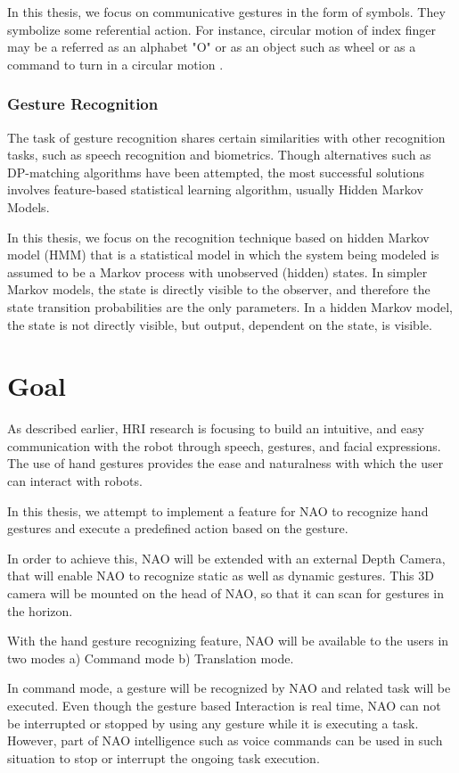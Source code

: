 In this thesis, we focus on communicative gestures in the form of symbols. They symbolize some referential action. For instance, circular motion of index finger may be a referred as an alphabet "O" or as an object such as wheel or as a command to turn in a circular motion .


\subsection{Gesture Recognition}
The task of gesture recognition shares certain similarities with other recognition tasks, such as speech recognition and biometrics. Though alternatives such as  DP-matching algorithms have been attempted, the most successful solutions involves feature-based statistical learning algorithm, usually Hidden Markov Models. 

In this thesis, we focus on the recognition technique based on hidden Markov model (HMM) that is a statistical model in which the system being modeled is assumed to be a Markov process with unobserved (hidden) states. In simpler Markov models, the state is directly visible to the observer, and therefore the state transition probabilities are the only parameters. In a hidden Markov model, the state is not directly visible, but output, dependent on the state, is visible.


\chapter{Goal} As described earlier, HRI research is focusing to build an intuitive, and easy communication with the robot through speech, gestures, and facial expressions. The use of hand gestures provides the ease and naturalness with which the user can interact with robots.

In this thesis, we attempt to implement a feature for NAO to recognize hand gestures and execute a predefined action based on the gesture. 

In order to achieve this, NAO will be extended with an external Depth Camera, that will enable NAO to recognize static as well as dynamic gestures. This 3D camera will be mounted on the head of NAO, so that it can scan for gestures in the horizon. 

With the hand gesture recognizing feature, NAO will be available to the users in two modes a) Command mode b) Translation mode.

In command mode, a gesture will be recognized by NAO and related task will be executed. Even though the gesture based Interaction is real time, NAO can not be interrupted or stopped by using any gesture while it is executing a task. However, part of NAO intelligence such as voice commands can be used in such situation to stop or interrupt the ongoing task execution.

